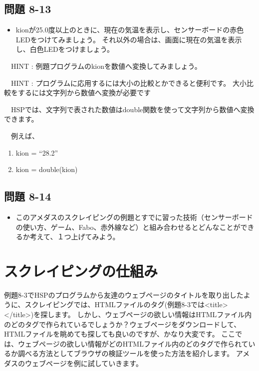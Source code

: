 \documentclass[a4paper,12pt,dvipdfmx]{jarticle}
\begin{document}
\subsection*{問題 8-13}
\begin{itemize}
\item
kionが25.0度以上のときに、現在の気温を表示し、センサーボードの赤色LEDをつけてみましょう。
		それ以外の場合は、画面に現在の気温を表示し、白色LEDをつけましょう。
\end{itemize}
\ \ HINT :
例題プログラムのkionを数値へ変換してみましょう。

\ \ HINT :
プログラムに応用するには大小の比較とかできると便利です。
大小比較をするには文字列から数値へ変換が必要です

\ \ HSPでは、文字列で表された数値はdouble関数を使って文字列から数値へ変換できます。

\ \ 例えば、



\begin{center}
\begin{boxedminipage}{8.326cm}
\begin{enumerate}
\baselineskip 10pt
\setlength{\itemsep}{0cm} %
\item kion = “28.2”
\item kion = double(kion)
\end{enumerate}
\end{boxedminipage}
\end{center}

\bigskip


\bigskip

\subsection*{問題 8-14}
\begin{itemize}
\item
このアメダスのスクレイピングの例題とすでに習った技術（センサーボードの使い方、ゲーム、Fabo、赤外線など）と組み合わせるとどんなことができるか考えて、１つ上げてみよう。
\end{itemize}

\bigskip


\bigskip

\clearpage\section{スクレイピングの仕組み}
例題8-3でHSPのプログラムから友達のウェブページのタイトルを取り出したように、スクレイピングでは、HTMLファイルのタグ(例題8-3では{\textless}title{\textgreater}{\textless}/title{\textgreater})を探します。
しかし、ウェブページの欲しい情報はHTMLファイル内のどのタグで作られているでしょうか？ウェブページをダウンロードして、HTMLファイルを眺めても探しても良いのですが、かなり大変です。
ここでは、ウェブページの欲しい情報がどのHTMLファイル内のどのタグで作られているか調べる方法としてブラウザの検証ツールを使った方法を紹介します。
アメダスのウェブページを例に試していきます。
\end{document}

